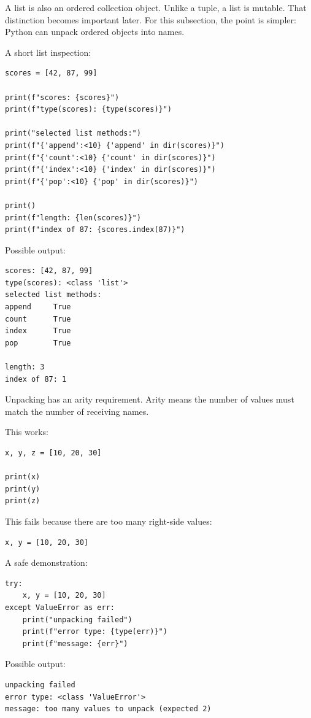A list is also an ordered collection object. Unlike a tuple, a list is mutable. That distinction becomes important later. For this subsection, the point is simpler: Python can unpack ordered objects into names.

A short list inspection:

\begin{verbatim}
scores = [42, 87, 99]

print(f"scores: {scores}")
print(f"type(scores): {type(scores)}")

print("selected list methods:")
print(f"{'append':<10} {'append' in dir(scores)}")
print(f"{'count':<10} {'count' in dir(scores)}")
print(f"{'index':<10} {'index' in dir(scores)}")
print(f"{'pop':<10} {'pop' in dir(scores)}")

print()
print(f"length: {len(scores)}")
print(f"index of 87: {scores.index(87)}")
\end{verbatim}

Possible output:

\begin{verbatim}
scores: [42, 87, 99]
type(scores): <class 'list'>
selected list methods:
append     True
count      True
index      True
pop        True

length: 3
index of 87: 1
\end{verbatim}

Unpacking has an arity requirement. Arity means the number of values must match the number of receiving names.

This works:

\begin{verbatim}
x, y, z = [10, 20, 30]

print(x)
print(y)
print(z)
\end{verbatim}

This fails because there are too many right-side values:

\begin{verbatim}
x, y = [10, 20, 30]
\end{verbatim}

A safe demonstration:

\begin{verbatim}
try:
    x, y = [10, 20, 30]
except ValueError as err:
    print("unpacking failed")
    print(f"error type: {type(err)}")
    print(f"message: {err}")
\end{verbatim}

Possible output:

\begin{verbatim}
unpacking failed
error type: <class 'ValueError'>
message: too many values to unpack (expected 2)
\end{verbatim}


